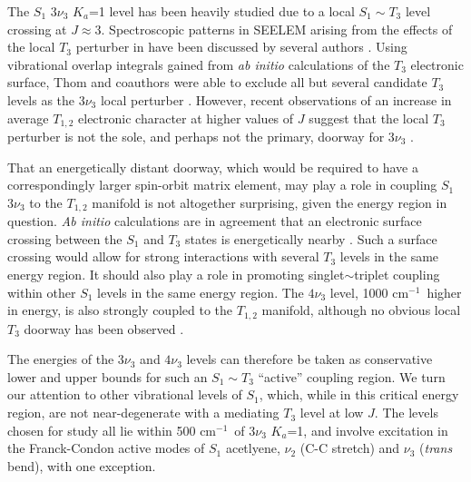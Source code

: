 \documentclass[12pt,draft]{mitthesis}
\newcommand{\POINT}[1]{\textcolor{magenta}{\textbf{POINT:} #1}}
\newcommand{\rcm}{cm$^{-1}$}
\begin{document}
The $S_1$ $3 \nu_3$ $K_a$=1 level has been heavily studied due to a
local $S_1 \sim T_3$ level crossing at $J \approx 3$.  Spectroscopic
patterns in SEELEM arising from the effects of the local $T_3$
perturber in have been discussed by several authors \cite{humphrey97,
  altunata00, altunata01, mishra04}.  Using vibrational overlap
integrals gained from \emph{ab initio} calculations of the $T_3$
electronic surface, Thom and coauthors were able to exclude all but
several candidate $T_3$ levels as the $3\nu_3$ local perturber
\cite{thom07}.
However, recent observations of an increase in average $T_{1,2}$
electronic character at higher values of $J$ suggest that the local
$T_3$ perturber is not the sole, and perhaps not the primary, doorway
for $3 \nu_3$ \cite{degroot07}.

That an energetically distant doorway, which would be required to have
a correspondingly larger spin-orbit matrix element, may play a role in
coupling $S_1$ $3 \nu_3$ to the $T_{1,2}$ manifold is not altogether
surprising, given the energy region in question.  \emph{Ab initio}
calculations are in agreement that an electronic surface crossing
between the $S_1$ and $T_3$ states is energetically nearby
\cite{ventura03, thom07}.  Such a surface crossing would allow for
strong interactions with several $T_3$ levels in the same energy
region.  It should also play a role in promoting singlet$\sim$triplet
coupling within other $S_1$ levels in the same energy region.  The
$4\nu_3$ level, 1000 \rcm\ higher in energy, is also strongly coupled
to the $T_{1,2}$ manifold, although no obvious local $T_3$ doorway has
been observed \cite{drabbels93, ochi91}.

The energies of the $3 \nu_3$ and $4\nu_3$ levels can therefore be
taken as conservative lower and upper bounds for such an $S_1 \sim
T_3$ ``active'' coupling region.  We turn our attention to other
vibrational levels of $S_1$, which, while in this critical energy
region, are not near-degenerate with a mediating $T_3$ level at low
$J$.  The levels chosen for study all lie within 500 \rcm\ of $3
\nu_3$ $K_a$=1, and involve excitation in the Franck-Condon active
modes of $S_1$ acetlyene, $\nu_2$ (C-C stretch) and $\nu_3$
(\emph{trans} bend), with one exception.
\end{document}
